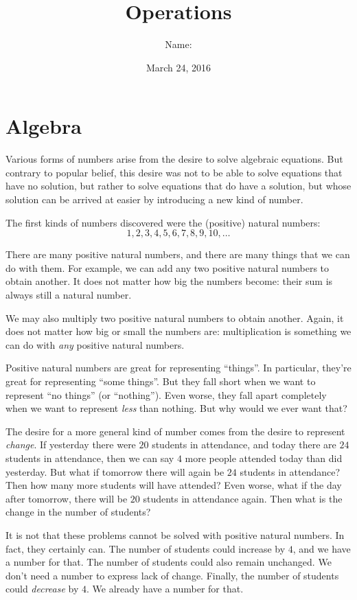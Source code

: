 \documentclass[12pt,a4paper]{report}
\title{Operations}
\author{Name: \underline{\hspace{6cm}}}
\date{March 24, 2016}
\begin{document}
\maketitle

\chapter{Algebra}

Various forms of numbers arise from the desire to solve algebraic equations. But
contrary to popular belief, this desire was not to be able to solve equations
that have no solution, but rather to solve equations that do have a solution,
but whose solution can be arrived at easier by introducing a new kind of number.

The first kinds of numbers discovered were the (positive) natural numbers: \[ 1,
2, 3, 4, 5, 6, 7, 8, 9, 10, \dots \]

There are many positive natural numbers, and there are many things that we can
do with them. For example, we can add any two positive natural numbers to obtain
another. It does not matter how big the numbers become: their sum is always
still a natural number.

We may also multiply two positive natural numbers to obtain another. Again, it
does not matter how big or small the numbers are: multiplication is something
we can do with \emph{any} positive natural numbers.

Positive natural numbers are great for representing ``things''. In particular,
they're great for representing ``some things''. But they fall short when we want
to represent ``no things'' (or ``nothing''). Even worse, they fall apart
completely when we want to represent \emph{less} than nothing. But why would we
ever want that?

The desire for a more general kind of number comes from the desire to represent
\emph{change}. If yesterday there were $20$ students in attendance, and today
there are $24$ students in attendance, then we can say $4$ more people attended
today than did yesterday. But what if tomorrow there will again be $24$ students
in attendance? Then how many more students will have attended? Even worse, what
if the day after tomorrow, there will be $20$ students in attendance again. Then
what is the change in the number of students?

It is not that these problems cannot be solved with positive natural numbers. In
fact, they certainly can. The number of students could increase by $4$, and we
have a number for that. The number of students could also remain unchanged. We
don't need a number to express lack of change. Finally, the number of students
could \emph{decrease} by $4$. We already have a number for that.
\end{document}
